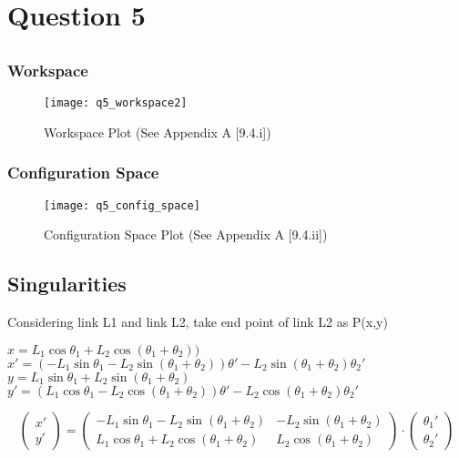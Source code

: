 \newpage
\section{Question 5}
	\subsection{}
		\subsubsection{Workspace}
			\begin{figure}[position = here]
			\begin{centering}
				\texttt{[image: q5\_workspace2]}\\
				\caption [WSpace]{Workspace Plot (See Appendix A [9.4.i])}
			\end{centering}
			\end{figure}
		
		\subsubsection{Configuration Space}
			\begin{figure}[position = here]
			\begin{centering}
				\texttt{[image: q5\_config\_space]}\\
				\caption [CSpace]{Configuration Space Plot (See Appendix A [9.4.ii])}
			\end{centering}
			\end{figure}
	\pagebreak		
	\subsection{Singularities}
Considering link L1 and link L2, take end point of link L2 as P(x,y)

$x = L_{1} \cos\theta_{1} + L_{2}\cos(\theta_{1}+\theta_{2}))$\\
$x' = (-L_{1}\sin\theta_{1}- L_{2}\sin(\theta_{1}+\theta_{2}))\theta' - L_{2}\sin(\theta_{1}+\theta_{2})\theta_{2}'$\\
$y = L_{1}\sin\theta_{1} + L_{2}\sin(\theta_{1} + \theta_{2})$\\
$y' = (L_{1}\cos\theta_{1}- L_{2}\cos(\theta_{1}+\theta_{2}))\theta' - L_{2}\cos(\theta_{1}+\theta_{2})\theta_{2}'$\\
\vspace{5mm}

$$
 \begin{pmatrix}
 x'\\y'
 \end{pmatrix} =
\begin{pmatrix}
- L_{1}\sin\theta_{1} - L_{2}\sin(\theta_{1} + \theta_{2}) & -L_{2}\sin(\theta_{1} + \theta_{2})\\
L_{1}\cos\theta_{1} + L_{2}\cos(\theta_{1} + \theta_{2}) & L_{2}\cos(\theta_{1} + \theta_{2})
\end{pmatrix}\cdot
\begin{pmatrix}
\theta_{1}'\\\theta_{2}'
\end{pmatrix}
$$

